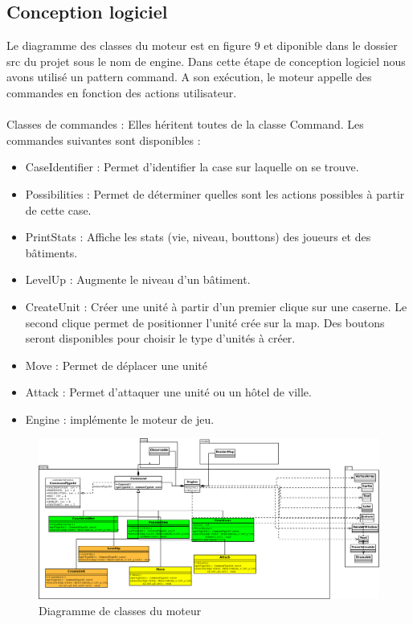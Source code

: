 \documentclass[12pt,a4paper]{article}
\begin{document}
\subsection{Conception logiciel}
Le diagramme des classes du moteur est en figure 9 et diponible dans le dossier src du projet sous le nom de engine.
Dans cette étape de conception logiciel nous avons utilisé un pattern command. A son exécution, le moteur appelle des commandes en fonction des actions utilisateur.\\

\\Classes de commandes : Elles héritent toutes de la classe Command. Les commandes suivantes sont disponibles :
\begin{itemize}
\item CaseIdentifier : Permet d'identifier la case sur laquelle on se trouve.
\item Possibilities : Permet de déterminer quelles sont les actions possibles à partir de cette case.
\item PrintStats : Affiche les stats (vie, niveau, bouttons) des joueurs et des bâtiments.
\item LevelUp : Augmente le niveau d'un bâtiment.
\item CreateUnit : Créer une unité à partir d'un premier clique sur une caserne. Le second clique permet de positionner l'unité crée sur la map. Des boutons seront disponibles pour choisir le type d'unités à créer.
\item Move : Permet de déplacer une unité
\item Attack : Permet d'attaquer une unité ou un hôtel de ville.
\item Engine : implémente le moteur de jeu.
\end{itemize}

\begin{figure}[!ht]
\centering
    \includegraphics[width=1\textwidth]{ressources/engine.png}
     \caption{Diagramme de classes du moteur}
\end{figure}
\end{document}
